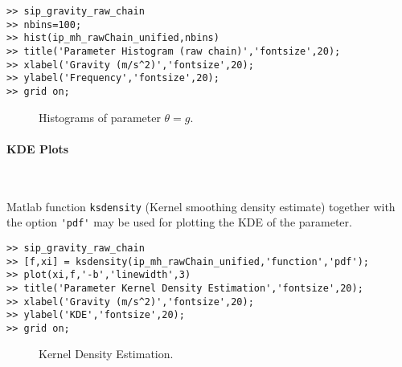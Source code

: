 \begin{lstlisting}[label=matlab:hist,caption={Matlab code for the histogram plot.}]
% inside Matlab
>> sip_gravity_raw_chain
>> nbins=100;
>> hist(ip_mh_rawChain_unified,nbins)
>> title('Parameter Histogram (raw chain)','fontsize',20);
>> xlabel('Gravity (m/s^2)','fontsize',20);
>> ylabel('Frequency','fontsize',20);
>> grid on;
\end{lstlisting}

\begin{figure}[p]
\centering 
{}
\vspace*{-10pt}
\caption{Histograms of parameter $\theta=g$. }
\end{figure}

\paragraph{KDE Plots} \

Matlab function \verb+ksdensity+ (Kernel smoothing density estimate) together with the 
option \verb+'pdf'+ may be used for plotting the KDE of the parameter.
\begin{lstlisting}[label=matlab:kde,caption={Matlab code for the KDE plot.}]
% inside Matlab
>> sip_gravity_raw_chain
>> [f,xi] = ksdensity(ip_mh_rawChain_unified,'function','pdf');
>> plot(xi,f,'-b','linewidth',3)
>> title('Parameter Kernel Density Estimation','fontsize',20);
>> xlabel('Gravity (m/s^2)','fontsize',20);
>> ylabel('KDE','fontsize',20);
>> grid on;
\end{lstlisting}

\begin{figure}[p]
\centering 
{}
\vspace*{-10pt}
\caption{Kernel Density Estimation. }
\end{figure}


